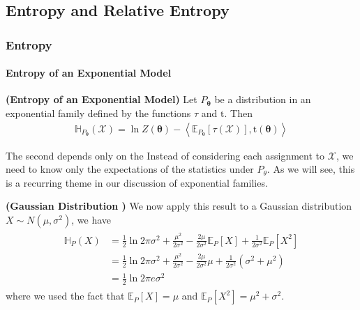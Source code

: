 \documentclass{article}
\newcommand{\bfs}[1]{\textbf{({#1}) }}
\begin{document}
\subsection{Entropy and Relative Entropy}
\subsubsection{Entropy}
\paragraph{Entropy of an Exponential Model}
\begin{thma}\bfs{Entropy of an Exponential Model}\label{thm:entropy_exp}
Let $P_{\boldsymbol{\theta}}$ be a distribution in an exponential family defined by the functions $\tau$ and $\mathrm{t}$. Then
\begin{align*}
\mathbb{H}_{P_{\boldsymbol{\theta}}}(\mathcal{X})=\ln Z(\boldsymbol{\theta})-\left\langle\mathbb{E}_{P_{\boldsymbol{\theta}}}[\tau(\mathcal{X})], \mathrm{t}(\boldsymbol{\theta})\right\rangle
\end{align*}
\end{thma}
\begin{rema}
The second depends only on the  Instead of considering each assignment to $\mathcal{X}$, we need to know only the expectations of the statistics under $P_{\theta}$. As we will see, this is a recurring theme in our discussion of exponential families.
\end{rema}
\begin{exma}\bfs{Gaussian Distribution }
We now apply this result to a Gaussian distribution $X \sim N\left(\mu, \sigma^{2}\right)$, we have
\begin{align*}
\begin{aligned}
\mathbb{H}_{P}(X) &=\frac{1}{2} \ln 2 \pi \sigma^{2}+\frac{\mu^{2}}{2 \sigma^{2}}-\frac{2 \mu}{2 \sigma^{2}} \mathbb{E}_{P}[X]+\frac{1}{2 \sigma^{2}} \mathbb{E}_{P}\left[X^{2}\right] \\
&=\frac{1}{2} \ln 2 \pi \sigma^{2}+\frac{\mu^{2}}{2 \sigma^{2}}-\frac{2 \mu}{2 \sigma^{2}} \mu+\frac{1}{2 \sigma^{2}}\left(\sigma^{2}+\mu^{2}\right) \\
&=\frac{1}{2} \ln 2 \pi e \sigma^{2}
\end{aligned}
\end{align*}
where we used the fact that $\mathbb{E}_{P}[X]=\mu$ and $\mathbb{E}_{P}\left[X^{2}\right]=\mu^{2}+\sigma^{2} .$
\end{exma}
\end{document}
